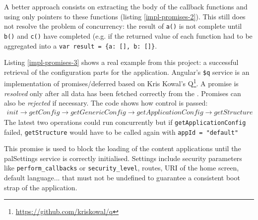 

A better approach consists on extracting the body of the callback functions and using only pointers to these functions (listing \ref{impl-promises-2}).
This still does not resolve the problem of concurrency: the result of \texttt{a()} is not complete until \texttt{b()} and \texttt{c()} have completed (e.g. if the returned value of each function had to be aggregated into a \lstinline$var result = {a: [], b: []}$. 



Listing \ref{impl-promises-3} shows a real example from this project: a successful retrieval of the configuration parts for the application.
Angular's \texttt{\$q} service is an implementation of promises/deferred based on Kris Kowal's Q\footnote{\url{https://github.com/kriskowal/q}}.
A promise is \emph{resolved} only after all data has been fetched correctly from the \flangobe .
Promises can also be \emph{rejected} if necessary.
The code shows how control is passed: 
\begin{eqnarray}
init \rightarrow getConfig \rightarrow getGenericConfig \rightarrow getApplicationConfig \rightarrow getStructure \nonumber
\end{eqnarray}
The latest two operations could run concurrently but if \texttt{getApplicationConfig} failed, \texttt{getStructure} would have to be called again with \texttt{appId = "default"}

This promise is used to block the loading of the content applications until the palSettings service is correctly initialised.
Settings include security parameters like \texttt{perform\_callbacks} or \texttt{security\_level}, routes, \ac{URI} of the home screen, default language... that must not be undefined to guarantee a consistent boot strap of the application.

